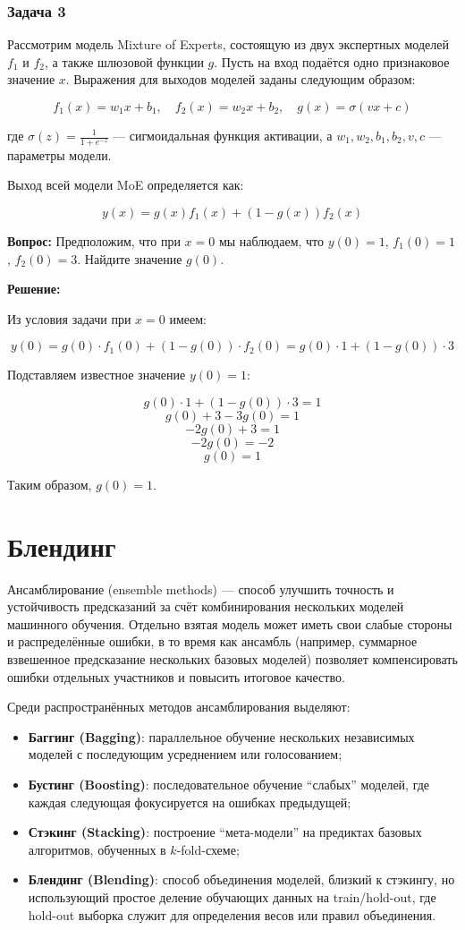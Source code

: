 \subsubsection{Задача 3}

Рассмотрим модель Mixture of Experts, состоящую из двух экспертных моделей $f_1$ и $f_2$, а также шлюзовой функции $g$. Пусть на вход подаётся одно признаковое значение $x$. Выражения для выходов моделей заданы следующим образом:

$$
f_1(x) = w_1 x + b_1, \quad f_2(x) = w_2 x + b_2, \quad g(x) = \sigma(v x + c)
$$

где $\sigma(z) = \frac{1}{1 + e^{-z}}$ — сигмоидальная функция активации, а $w_1, w_2, b_1, b_2, v, c$ — параметры модели.

Выход всей модели MoE определяется как:

$$
y(x) = g(x) f_1(x) + (1 - g(x)) f_2(x)
$$

\textbf{Вопрос:} Предположим, что при $x = 0$ мы наблюдаем, что $y(0) = 1$, $f_1(0) = 1$, $f_2(0) = 3$. Найдите значение $g(0)$.

\textbf{Решение:}

Из условия задачи при $x = 0$ имеем:

$$
y(0) = g(0) \cdot f_1(0) + (1 - g(0)) \cdot f_2(0) = g(0) \cdot 1 + (1 - g(0)) \cdot 3
$$

Подставляем известное значение $y(0) = 1$:

$$
g(0) \cdot 1 + (1 - g(0)) \cdot 3 = 1
$$
$$
g(0) + 3 - 3g(0) = 1
$$
$$
-2g(0) + 3 = 1
$$
$$
-2g(0) = -2
$$
$$
g(0) = 1
$$

Таким образом, $g(0) = 1$.

\section{Блендинг}
Ансамблирование (ensemble methods) --- способ улучшить точность и устойчивость предсказаний за счёт комбинирования нескольких моделей машинного обучения. Отдельно взятая модель может иметь свои слабые стороны и распределённые ошибки, в то время как ансамбль (например, суммарное взвешенное предсказание нескольких базовых моделей) позволяет компенсировать ошибки отдельных участников и повысить итоговое качество.

Среди распространённых методов ансамблирования выделяют:
\begin{itemize}
    \item \textbf{Баггинг (Bagging)}: параллельное обучение нескольких независимых моделей с последующим усреднением или голосованием;
    \item \textbf{Бустинг (Boosting)}: последовательное обучение ``слабых'' моделей, где каждая следующая фокусируется на ошибках предыдущей;
    \item \textbf{Стэкинг (Stacking)}: построение ``мета-модели'' на предиктах базовых алгоритмов, обученных в $k$-fold-схеме;
    \item \textbf{Блендинг (Blending)}: способ объединения моделей, близкий к стэкингу, но использующий простое деление обучающих данных на train/hold-out, где hold-out выборка служит для определения весов или правил объединения.
\end{itemize}

